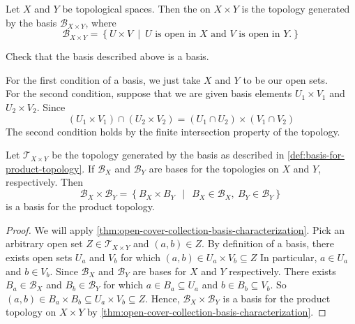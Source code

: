 \begin{dfn}\label{def:basis-for-product-topology}
    Let \( X \) and \( Y \) be topological spaces. Then the  on \( X \times Y \) is the topology generated by the basis \( \mathscr{B}_{X \times Y} \), where 
    \[ \mathscr{B}_{X \times Y} = \left\{ U \times V \ \middle| \  U \text{ is open in } X \text{ and } V \text{ is open in } Y. \right\} \]
\end{dfn}

\begin{exercise}
    Check that the basis described above is a basis.
\end{exercise}
\begin{solution}
    For the first condition of a basis, we just take \( X \) and \( Y \) to be our open sets. \\ 
    For the second condition, suppose that we are given basis elements \( U_{1} \times  V_{1} \) and \( U_{2} \times  V_{2} \). Since 
    \[ \left( U_{1} \times  V_{1}\right) \cap \left( U_{2} \times  V_{2}\right) = \left( U_{1} \cap U_{2} \right) \times \left( V_{1} \cap V_{2} \right)\]
    The second condition holds by the finite intersection property of the topology.
\end{solution}

\begin{lemma}
    Let \( \mathscr{T}_{X \times  Y} \) be the topology generated by the basis as described in \cref{def:basis-for-product-topology}. If \( \mathscr{B}_{X} \) and \( \mathscr{B}_{Y} \) are bases for the topologies on \( X \) and \( Y \), respectively. Then 
    \[ \mathscr{B}_{X} \times  \mathscr{B}_{Y} = \left\{ B_{X} \times  B_{Y} \ \ \middle| \ \ B_{X} \in \mathscr{B}_{X},\ B_{Y} \in \mathscr{B}_{Y} \right\} \]
    is a basis for the product topology.
\end{lemma}
\begin{proof}
  We will apply \cref{thm:open-cover-collection-basis-characterization}. Pick an arbitrary open set \( Z \in \mathscr{T}_{X \times Y} \) and \( \left( a,b \right) \in Z \). By definition of a basis, there exists open sets \( U_{a} \) and \( V_{b} \) for which \( \left( a,b \right) \in U_{a} \times V_{b} \subseteq Z \) In particular, \( a \in U_{a} \) and \( b \in V_{b} \). Since \( \mathscr{B}_{X} \) and \( \mathscr{B}_{Y} \) are bases for \( X \) and \( Y \) respectively. There exists \( B_{a} \in \mathscr{B}_{X}  \) and \( B_{b} \in \mathscr{B}_{Y} \) for which \( a \in B_{a} \subseteq U_{a} \) and \( b \in B_{b} \subseteq V_{b} \). So \( \left( a,b \right) \in B_{a} \times B_{b} \subseteq U_{a} \times V_{b} \subseteq Z \). Hence, \( \mathscr{B}_{X} \times  \mathscr{B}_{Y} \) is a basis for the product topology on \( X \times Y \) by \cref{thm:open-cover-collection-basis-characterization}.
\end{proof}

